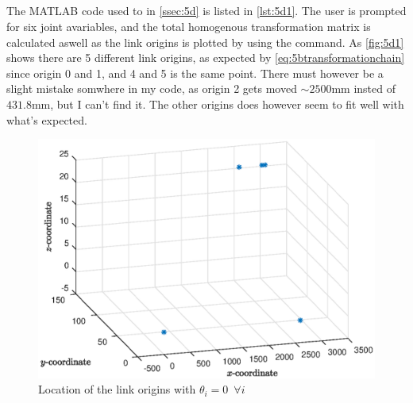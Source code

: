 \documentclass[a4paper]{scrartcl}
\begin{document}
\subsection{}\label{ssec:5d} %
The MATLAB code used to in \autoref{ssec:5d} is listed in \autoref{lst:5d1}. The user is prompted for six joint avariables, and the total homogenous transformation matrix is calculated aswell as the link origins is plotted by using the  command. As \autoref{fig:5d1} shows there are 5 different link origins, as expected by \eqref{eq:5btransformationchain} since origin 0 and 1, and 4 and 5 is the same point. There must however be a slight mistake somwhere in my code, as origin 2 gets moved $\sim 2500 \si{\mm}$ insted of $431.8\si{\mm}$, but I can't find it. The other origins does however seem to fit well with what's expected.

\begin{figure}[ht!]
    \centering
    \includegraphics[width = .95\textwidth]{5d1.eps}
    \caption{Location of the link origins with $\theta_i = 0 \enspace \forall i$}
    \label{fig:5d1}
\end{figure}
\end{document}
